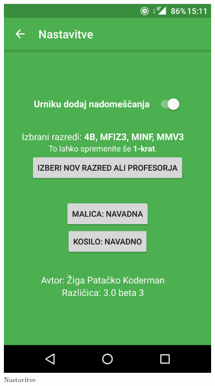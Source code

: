 \begin{figure}[!htb]
  \includegraphics[width=\linewidth]{images/settings.png}
  \caption{Nastavitve}\label{fig:settings_activity}
\endminipage\hfill
{}%

\end{figure}
